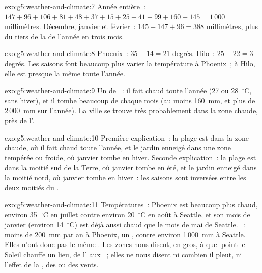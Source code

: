 \begin{solution}{exo:g5:weather-and-climate:7}
Année entière~: $147 + 96 + 106 + 81 + 48 + 37 + 15 + 25 + 41 + 99 + 160 + 145
= 1\,000$ millimètres. Décembre, janvier et février~:
$145 + 147 + 96 = 388$ millimètres, plus du tiers de la  de l'année en
trois mois.
\end{solution}

\begin{solution}{exo:g5:weather-and-climate:8}
Phoenix~: $35 - 14 = 21$ degrés. Hilo~: $25 - 22 = 3$ degrés. Les saisons
font beaucoup plus varier la température à Phoenix~; à Hilo, elle est
presque la même toute l'année.
\end{solution}

\begin{solution}{exo:g5:weather-and-climate:9}
Un  de ~: il fait chaud toute l'année (27 ou
28~$^\circ$C, sans hiver), et il tombe beaucoup de  chaque mois (au
moins 160~mm, et plus de 2\,000~mm sur l'année). La ville se trouve très
probablement dans la zone chaude, près de l'.
\end{solution}

\begin{solution}{exo:g5:weather-and-climate:10}
Première explication~: la plage est dans la zone chaude, où il fait chaud
toute l'année, et le jardin enneigé dans une zone tempérée ou froide, où
janvier tombe en hiver. Seconde explication~: la plage est dans la moitié
sud de la Terre, où janvier tombe en été, et le jardin enneigé dans la
moitié nord, où janvier tombe en hiver~: les saisons sont inversées entre
les deux moitiés du .
\end{solution}

\begin{solution}{exo:g5:weather-and-climate:11}
Températures~: Phoenix est beaucoup plus chaud, environ 35~$^\circ$C en
juillet contre environ 20~$^\circ$C en août à Seattle, et son mois de
janvier (environ 14~$^\circ$C) est déjà aussi chaud que le mois de mai de
Seattle. ~: moins de 200~mm par an à Phoenix, un , contre
environ 1\,000~mm à Seattle. Elles n'ont donc pas le même . Les zones
nous disent, en gros, à quel point le Soleil chauffe un lieu, de l'
aux ~; elles ne nous disent ni combien il pleut, ni l'effet de la ,
des  ou des vents.
\end{solution}
